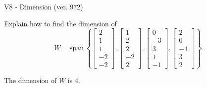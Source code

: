 \begin{exercise}
  \begin{exerciseTitle}V8 - Dimension (ver. 972)\end{exerciseTitle}
  \begin{exerciseStatement}
    Explain how to find the dimension of 
\[W=\mathrm{span}\ \left\{\left[\begin{array}{r}
2 \\
1 \\
1 \\
-2 \\
-2
\end{array}\right] , \left[\begin{array}{r}
1 \\
2 \\
2 \\
-2 \\
2
\end{array}\right] , \left[\begin{array}{r}
0 \\
-3 \\
3 \\
1 \\
-1
\end{array}\right] , \left[\begin{array}{r}
2 \\
0 \\
-1 \\
3 \\
2
\end{array}\right]\right\}.\]



  \end{exerciseStatement}
  \begin{exerciseAnswer}
   The dimension of \(W\) is  \(4\).
  


  \end{exerciseAnswer}
\end{exercise}